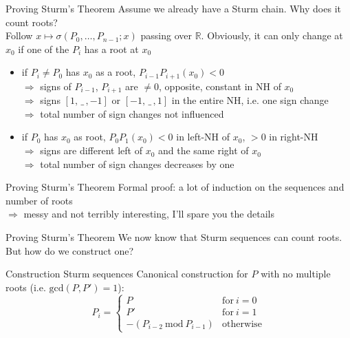 \documentclass[%
	sans,			%
	mathsans,		%
	10pt,
	t		%
	slidescentered,%
]{beamer}
\newcommand{\RR}{\mathbb{R}}
\begin{document}
\begin{frame}{Proving Sturm's Theorem}
Assume we already have a Sturm chain. Why does it count roots?\\
Follow $x \mapsto \sigma(P_0, \ldots, P_{n-1}; x)$ passing over $\RR$. Obviously, it can only change at $x_0$ if one of the $P_i$ has a root at $x_0$\pause
\begin{itemize}
\item if $P_i \neq P_0$ has $x_0$ as a root, $P_{i-1}P_{i+1}(x_0) < 0$\\\pause
$\Rightarrow$ signs of $P_{i-1}$, $P_{i+1}$ are $\neq 0$, opposite, constant in NH of $x_0$\\\pause
$\Rightarrow$ signs $[1,\, \_\,, -1]$ or $[-1,\, \_\,, 1]$ in the entire NH, i.e. one sign change\\\pause
$\Rightarrow$ total number of sign changes not influenced\\[1mm]\pause
\item if $P_0$ has $x_0$ as root, $P_0P_1(x_0) < 0$ in left-NH of $x_0$, $>0$ in right-NH\\\pause
$\Rightarrow$ signs are different left of $x_0$ and the same right of $x_0$\\\pause
$\Rightarrow$ total number of sign changes decreases by one
\end{itemize}
\end{frame}

\begin{frame}{Proving Sturm's Theorem}
Formal proof: a lot of induction on the sequences and number of roots\\[2mm]
$\Longrightarrow$ messy and not terribly interesting, I'll spare you the details
\end{frame}

\begin{frame}{Proving Sturm's Theorem}
We now know that Sturm sequences can count roots.\\
But how do we construct one?
\end{frame}

\begin{frame}{Construction Sturm sequences}
Canonical construction for $P$ with no multiple roots (i.e. $\mathrm{gcd}(P,P') = 1$):
$$P_i = \begin{cases}
P & \mathrm{for}\ i = 0\\
P' & \mathrm{for}\ i = 1\\
-(P_{i-2}\ \mathrm{mod}\ P_{i-1}) & \mathrm{otherwise}
\end{cases}$$
\end{frame}
\end{document}
